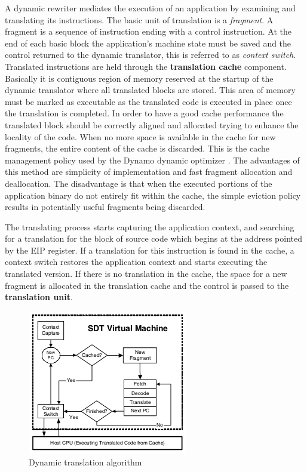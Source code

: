 A dynamic rewriter mediates the execution of an application by examining and translating its instructions. The basic unit of translation is a \emph{fragment}. A fragment is a sequence of instruction ending with a control instruction.  At the end of each basic block the application’s machine state must be saved and the control returned to the dynamic translator, this is referred to as \emph{context switch}. Translated instructions are held through the \textbf{translation cache} component. Basically it is contiguous region of memory reserved at the startup of the dynamic translator where all translated blocks are stored. This area of memory must be marked as executable as the translated code is executed in place once the translation is completed.  In order to have a good cache performance the translated block should be correctly aligned and allocated trying to enhance the locality of the code. When no more space is available in the cache for new fragments, the entire content of the cache is discarded. This is the cache management policy used by the Dynamo dynamic optimizer \cite{DynamoRio}. The advantages of this method are simplicity of implementation and fast fragment allocation and deallocation. The disadvantage is that when the executed portions of the application binary do not entirely fit within the cache, the simple eviction policy results in potentially useful fragments being discarded. 

The translating process starts capturing the application context, and searching for a translation for the block of source code which begins at the address pointed by the EIP register. If a translation for this instruction is found in the cache, a context switch restores the application context and starts executing the translated version.  If there is no translation in the cache, the space for a new fragment is allocated in the translation cache and the control is passed to the \textbf{translation unit}.

\begin{figure}[t]
\centering
\includegraphics[scale=1]{Chapter3/Chapter3Figs/dynamic_algorithm.png} 
\caption{Dynamic translation algorithm}
\label{fig:dynamic translation algorithm}
\end{figure}

